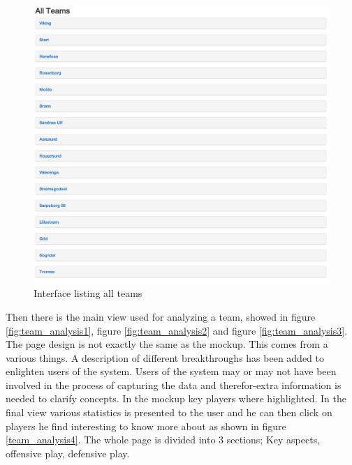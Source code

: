 \begin{figure}[ht!]
\centering
\includegraphics[width=1\textwidth]{images/general/all_teams.png}
\caption{Interface listing all teams}
\label{fig:all_teams}
\end{figure}

Then there is the main view used for analyzing a team, showed in figure \ref{fig:team_analysis1}, figure \ref{fig:team_analysis2} and figure \ref{fig:team_analysis3}. The page design is not exactly the same as the mockup. This comes from a various things. A description of different breakthroughs has been added to enlighten users of the system. Users of the system may or may not have been involved in the process of capturing the data and therefor-extra information is needed to clarify concepts. In the mockup key players where highlighted. In the final view various statistics is presented to the user and he can then click on players he find interesting to know more about as shown in figure \ref{team_analysis4}. The whole page is divided into 3 sections; Key aspects, offensive play, defensive play.

